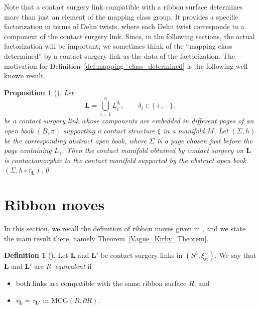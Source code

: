 \documentclass{amsart}
\numberwithin{equation}{section}
\numberwithin{figure}{section}
\newtheorem{proposition}[theorem]{Proposition}
\theoremstyle{definition}
\newtheorem{definition}[theorem]{Definition}
\theoremstyle{remark}
\let\oldSigma\Sigma
\renewcommand{\Sigma}{\oldSigma}
\let\oldtau\tau
\renewcommand{\tau}{\oldtau}
\let\olddxi\xi %
\renewcommand{\xi}{\olddxi}
\newcommand{\xist}{\olddxi_{\mathrm{st}}}
\begin{document}
Note that a contact surgery link compatible with a ribbon surface determines more than just an element of the mapping class group. It provides a specific
factorization in terms of Dehn twists, where each Dehn twist corresponds to a component of the contact surgery link. Since, in the following sections, the actual
factorization will be important; we sometimes think of
the “mapping class determined” by a contact surgery link as the data of the
factorization.
The motivation for Definition~\ref{def:mapping_class_determined} is the following well-known result.

\begin{proposition}[{\cite{Gay,Etnyre06}}]\label{prop:Dehn_surgery_Dehn_twist}
  Let
  \[
    \boldsymbol{L}
    =
    \bigcup_{i=1}^n L_i^{\delta_i},
    \qquad
    \delta_i\in\{+,-\},
  \]
  be a contact surgery link whose components are embedded in different pages of an open book $(B,\pi)$ supporting a contact structure $\xi$ in a manifold $M$. Let $(\Sigma,h)$ be the corresponding abstract open book, where $\Sigma$ is a page chosen just before the page containing $L_1$. Then the contact manifold obtained by contact surgery on $\boldsymbol{L}$ is contactomorphic to the contact manifold supported by the abstract open book $(\Sigma, h\circ\tau_{\scriptscriptstyle{\boldsymbol{L}}})$.\qed
\end{proposition}

\section{Ribbon moves}\label{sec:ribbonmovesadvek}

In this section, we recall the definition of ribbon moves given in \cite{Avdek13}, and we state the main result there, namely Theorem~\ref{Vague_Kirby_Theorem}.

\begin{definition}[{\cite[Definition~6.2]{Avdek13}}]\label{RequivalentV1}
  Let $\boldsymbol{L}$ and $\boldsymbol{L}'$ be contact surgery links in $(S^3,\xist)$. We say that $\boldsymbol{L}$ and $\boldsymbol{L}'$ are \emph{$R$–equivalent} if
  \begin{itemize}
    \item both links are compatible with the same ribbon surface $R$, and
    \item $\tau_{\scriptscriptstyle{\boldsymbol{L}}}=\tau_{\scriptscriptstyle{\boldsymbol{L}'}}$ in $\mathrm{MCG}(R,\partial R)$.
  \end{itemize}
\end{definition}
\end{document}
